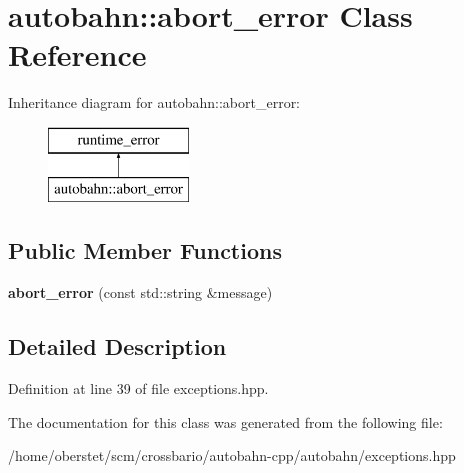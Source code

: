 \hypertarget{classautobahn_1_1abort__error}{}\section{autobahn\+:\+:abort\+\_\+error Class Reference}
\label{classautobahn_1_1abort__error}
Inheritance diagram for autobahn\+:\+:abort\+\_\+error\+:\begin{figure}[H]
\begin{center}
\leavevmode
\includegraphics[height=2.000000cm]{classautobahn_1_1abort__error}
\end{center}
\end{figure}
\subsection*{Public Member Functions}
\begin{DoxyCompactItemize}
\item 
{\bfseries abort\+\_\+error} (const std\+::string \&message)\hypertarget{classautobahn_1_1abort__error_a8144c7a932bf86c342d527f85d1eddbd}{}\label{classautobahn_1_1abort__error_a8144c7a932bf86c342d527f85d1eddbd}

\end{DoxyCompactItemize}


\subsection{Detailed Description}


Definition at line 39 of file exceptions.\+hpp.



The documentation for this class was generated from the following file\+:\begin{DoxyCompactItemize}
\item 
/home/oberstet/scm/crossbario/autobahn-\/cpp/autobahn/exceptions.\+hpp\end{DoxyCompactItemize}
